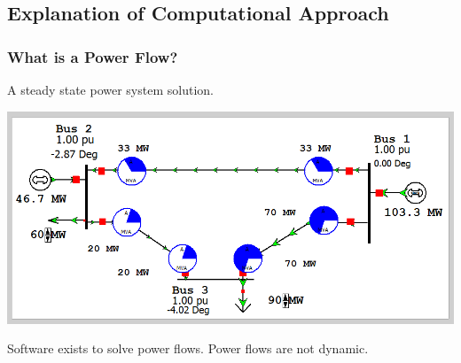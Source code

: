 \documentclass[14pt, unknownkeysallowed]{beamer}
\begin{document}
\subsection{Explanation of Computational Approach}
\begin{frame}
\frametitle{What is a Power Flow?}
		A steady state power system solution.\\%
				
		

\begin{center}
	\includegraphics[width=.6\linewidth]{powerFlowSingle} 
\end{center}
	Software exists to solve power flows.
Power flows are not dynamic. \\




\end{frame}
\end{document}
